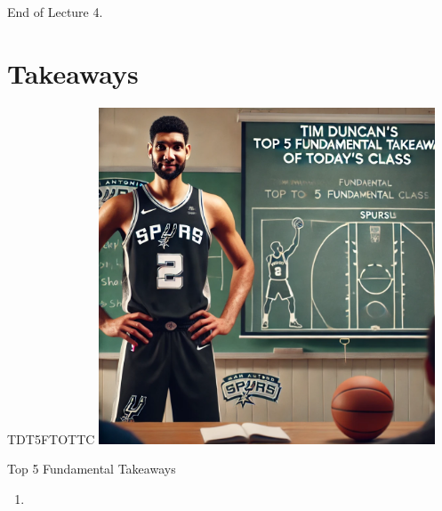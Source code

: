 \documentclass{beamer}
\begin{document}
\begin{frame}{}
\end{frame}

\begin{frame}{}
    \centering
    \Huge End of Lecture 4.
\end{frame}

\section*{Takeaways}

\begin{frame}{TDT5FTOTTC}
    \centering
    \includegraphics[width=0.75\textwidth]{figures/tim.png}
\end{frame}

\begin{frame}{Top 5 Fundamental Takeaways}
    \small
    \begin{enumerate} \pause
        \item[5] \pause

    \end{enumerate}
\end{frame}
\end{document}
